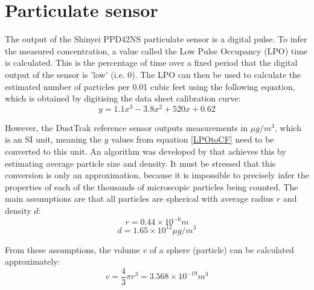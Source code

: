 \documentclass[11pt]{report}
\begin{document}


\section{Particulate sensor}

The output of the Shinyei PPD42NS particulate sensor is a digital pulse. To infer the measured concentration, a value called the Low Pulse Occupancy (LPO) time is calculated. This is the percentage of time over a fixed period that the digital output of the sensor is 'low' (i.e. 0). The LPO can then be used to calculate the estimated number of particles per 0.01 cubic feet using the following equation, which is obtained by digitising the data sheet calibration curve:
\begin{equation}
\label{LPOtoCF}
y = 1.1x^3 - 3.8x^2 + 520x + 0.62
\end{equation}

However, the DustTrak reference sensor outputs measurements in $\mu g/m^3$, which is an SI unit, meaning the $y$ values from equation \ref{LPOtoCF} need to be converted to this unit. An algorithm was developed by \cite{uva2009preliminary} that achieves this by estimating average particle size and density. It must be stressed that this conversion is only an approximation, because it is impossible to precisely infer the properties of each of the thousands of microscopic particles being counted. The main assumptions are that all particles are spherical with average radius $r$ and density $d$:
\begin{equation}
r = 0.44 \times 10^{-6} m
\end{equation}
\begin{equation}
d =  1.65 \times 10^{12} \mu g/m^3
\end{equation}

From these assumptions, the volume $v$ of a sphere (particle) can be calculated approximately:
\begin{equation}
v = \frac{4}{3} \pi r^3 = 3.568 \times 10^{-19} m^3
\end{equation}
\end{document}

